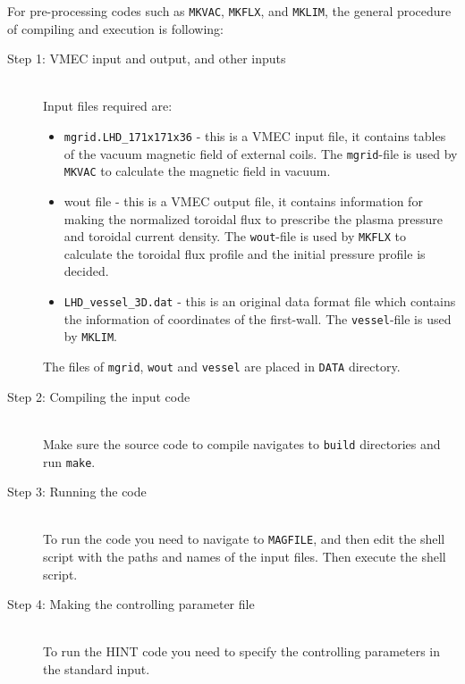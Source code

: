 \documentclass[10pt]{ltxdoc} %
\begin{document}
For pre-processing codes such as \texttt{MKVAC}, \texttt{MKFLX}, and \texttt{MKLIM}, the general procedure of compiling and execution is following:
\begin{description}
 \item[Step 1: VMEC input and output, and other inputs]\mbox{}\\
 Input files required are:
 \begin{itemize}
  \item \verb|mgrid.LHD_171x171x36| - this is a VMEC input file, it contains tables of the vacuum magnetic field of external coils. The \texttt{mgrid}-file is used by \texttt{MKVAC} to calculate the magnetic field in vacuum.  
  
  \item wout file - this is a VMEC output file, it contains information for making the normalized toroidal flux to prescribe the plasma pressure and toroidal current density. The \texttt{wout}-file is used by \texttt{MKFLX} to calculate the toroidal flux profile and the initial pressure profile is decided. 

  \item \verb|LHD_vessel_3D.dat| - this is an original data format file which contains the information of coordinates of the first-wall. The \texttt{vessel}-file is used by \texttt{MKLIM}.
 \end{itemize}
The files of \texttt{mgrid}, \texttt{wout} and \texttt{vessel} are placed in \texttt{DATA} directory. 

 \item[Step 2: Compiling the input code]\mbox{}\\
  Make sure the source code to compile navigates to \texttt{build} directories and run \texttt{make}.

 \item[Step 3: Running the code]\mbox{}\\
  To run the code you need to navigate to \texttt{MAGFILE}, and then edit the shell script with the paths and names of the input files. Then execute the shell script.

 \item[Step 4: Making the controlling parameter file]\mbox{}\\
 To run the HINT code you need to specify the controlling parameters in the standard input.
 
\end{description}
\end{document}
